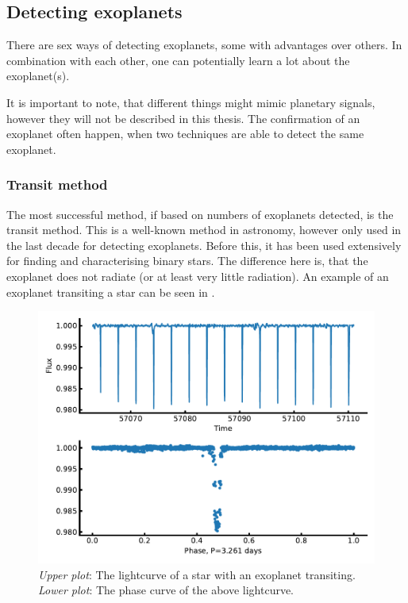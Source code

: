 \subsection{Detecting exoplanets}
\label{sec:detecting_exoplanets}

There are sex ways of detecting exoplanets, some with advantages over others. In combination with
each other, one can potentially learn a lot about the exoplanet(s).

It is important to note, that different things might mimic planetary signals, however they will not
be described in this thesis. The confirmation of an exoplanet often happen, when two techniques are
able to detect the same exoplanet.



\subsubsection{Transit method}
\label{sec:transitMethod}

The most successful method, if based on numbers of exoplanets detected, is the transit method. This
is a well-known method in astronomy, however only used in the last decade for detecting exoplanets.
Before this, it has been used extensively for finding and characterising binary stars. The
difference here is, that the exoplanet does not radiate (or at least very little radiation). An
example of an exoplanet transiting a star can be seen in .

\begin{figure}[htpb!]
    \centering
    \includegraphics[width=1.0\linewidth]{figures/transitMethod.pdf}
    \caption{\emph{Upper plot}: The lightcurve of a star with an exoplanet transiting.
             \emph{Lower plot}: The phase curve of the above lightcurve.}
    \label{fig:transitMethod}
\end{figure}

